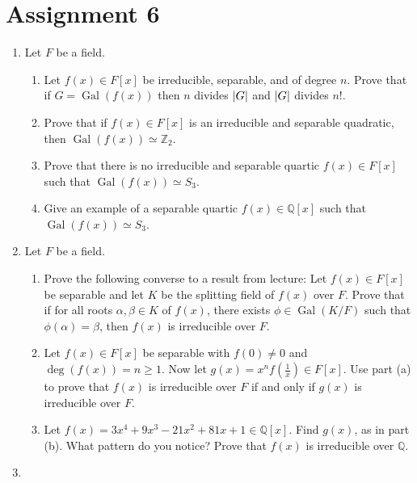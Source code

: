 \documentclass[notoc,notitlepage,nobib]{tufte-book}
\DeclareMathOperator{\Gal}{Gal}
\begin{document}

\section{Assignment 6}%
\label{sec:assignment_6}

\begin{enumerate}
  \item Let $F$ be a field.
    \begin{enumerate}
      \item Let $f(x) \in F[x]$ be irreducible, separable, and of degree $n$.
        Prove that if $G = \Gal(f(x))$ then $n$ divides $\left|G\right|$ and $\left|G\right|$
        divides $n!$.
      \item Prove that if $f(x) \in F[x]$ is an irreducible and separable
        quadratic, then $\Gal(f(x)) \simeq \mathbb{Z}_2$.
      \item Prove that there is no irreducible and separable quartic $f(x) \in
        F[x]$ such that $\Gal(f(x)) \simeq S_3$.
      \item Give an example of a separable quartic $f(x) \in \mathbb{Q}[x]$ such
        that \\ $\Gal(f(x)) \simeq S_3$.
    \end{enumerate}
  \item Let $F$ be a field.
    \begin{enumerate}
      \item Prove the following converse to a result from lecture: Let $f(x) \in
        F[x]$ be separable and let $K$ be the splitting field of $f(x)$ over
        $F$. Prove that if for all roots $\alpha, \beta \in K$ of $f(x)$, there
        exists $\phi \in \Gal(K / F)$ such that $\phi(\alpha) = \beta$, then
        $f(x)$ is irreducible over $F$.
      \item Let $f(x) \in F[x]$ be separable with $f(0) \neq 0$ and $\deg(f(x))
        = n \geq 1$. Now let $g(x) = x^n f \left( \frac{1}{x} \right) \in F[x]$.
        Use part (a) to prove that $f(x)$ is irreducible over $F$ if and only if
        $g(x)$ is irreducible over $F$.
      \item Let $f(x) = 3x^4 + 9x^3 - 21 x^2 + 81x + 1 \in \mathbb{Q}[x]$. Find
        $g(x)$, as in part (b). What pattern do you notice? Prove that $f(x)$ is
        irreducible over $\mathbb{Q}$.
    \end{enumerate}
  \item \begin{enumerate}

\end{enumerate}
\end{enumerate}
\end{document}
